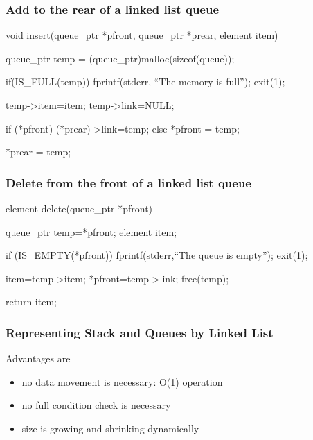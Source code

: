 \documentclass[newPxFont,sthlmFooter,nooffset]{beamer}
\begin{document}
\begin{frame}[t, fragile]
  \frametitle{Add to the rear of a linked list queue}
  \begin{ncodedef}
void insert(queue_ptr *pfront, 
            queue_ptr *prear, 
            element item) {
    queue_ptr temp = (queue_ptr)malloc(sizeof(queue));

    if(IS_FULL(temp)) {
        fprintf(stderr, ``The memory is full\n''); 
        exit(1);
    } 

    temp->item=item; 
    temp->link=NULL; 
    
    if (*pfront) 
        (*prear)->link=temp; 
    else
        *pfront = temp; 

    *prear = temp;
}    
  \end{ncodedef}
\end{frame}

\begin{frame}[t, fragile]
  \frametitle{Delete from the front of a linked list queue}
  \begin{ncodedef}
element delete(queue_ptr *pfront) { 
    queue_ptr temp=*pfront;
    element item;

    if (IS_EMPTY(*pfront)) {
        fprintf(stderr,``The queue is empty\n'');
        exit(1); 
    }

    item=temp->item; 
    *pfront=temp->link; 
    free(temp);

    return item;
}    
  \end{ncodedef}
\end{frame}

\begin{frame}[t]
  \frametitle{Representing Stack and Queues by Linked List}
Advantages are
\begin{itemize}
\item no data movement is necessary: O(1) operation
\item no full condition check is necessary
\item size is growing and shrinking dynamically
\end{itemize}


\end{frame}
\end{document}
